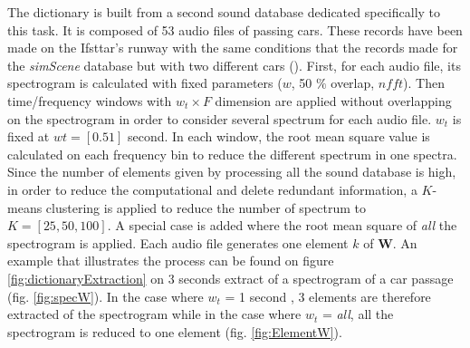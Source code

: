 \documentclass[twocolumn,a4paper,10pt]{article}
\begin{document}
The dictionary is built from a second sound database dedicated specifically to this task. It is composed of 53 audio files of passing cars. These records have been made on the Ifsttar's runway with the same conditions that the records made for the \textit{simScene} database but with two different cars (). First, for each audio file, its spectrogram is calculated with fixed parameters ($w$, 50 $\%$ overlap, $nfft$). Then time/frequency windows with $w_t \times F$ dimension are applied without overlapping on the spectrogram in order to consider several spectrum for each audio file. $w_t$ is fixed at $wt = [0.5 1]$ second. In each window, the root mean square value is calculated on each frequency bin to reduce the different spectrum in one spectra. Since the number of elements given by processing all the sound database is high, in order to reduce the computational and delete redundant information, a $K$-means clustering is applied to reduce the number of spectrum to $K = \left[ 25, 50, 100 \right]$. A special case is added where the root mean square of \textit{all} the spectrogram is applied. Each audio file generates one element $k$ of $\mathbf{W}$. An example that illustrates the process can be found on figure \ref{fig:dictionaryExtraction} on 3 seconds extract of a spectrogram of a car passage (fig. \ref{fig:specW}). In the case where $w_t$ = 1 second , 3 elements are therefore extracted of the spectrogram while in the case where $w_t$ = \textit{all}, all the spectrogram is reduced to one element (fig. \ref{fig:ElementW}).
\end{document}
